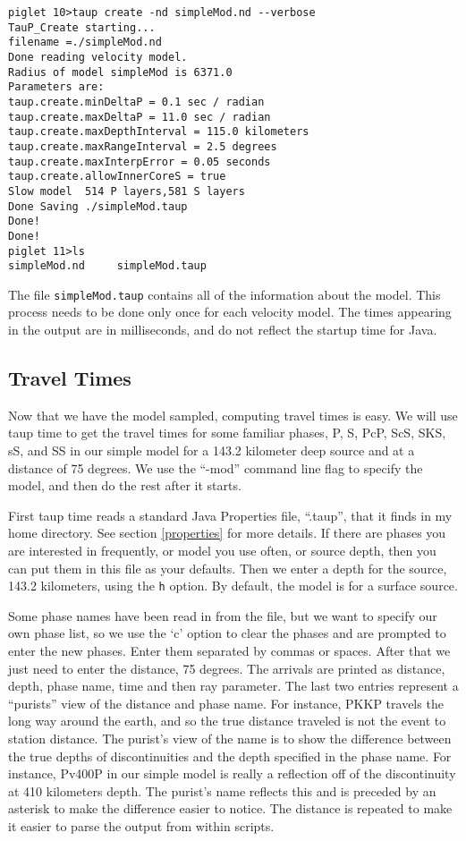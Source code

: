 \begin{verbatim}
piglet 10>taup create -nd simpleMod.nd --verbose
TauP_Create starting...
filename =./simpleMod.nd
Done reading velocity model.
Radius of model simpleMod is 6371.0
Parameters are:
taup.create.minDeltaP = 0.1 sec / radian
taup.create.maxDeltaP = 11.0 sec / radian
taup.create.maxDepthInterval = 115.0 kilometers
taup.create.maxRangeInterval = 2.5 degrees
taup.create.maxInterpError = 0.05 seconds
taup.create.allowInnerCoreS = true
Slow model  514 P layers,581 S layers
Done Saving ./simpleMod.taup
Done!
Done!
piglet 11>ls
simpleMod.nd     simpleMod.taup
\end{verbatim}

The file \texttt{simpleMod.taup} contains all of the information about the
model. This process needs to be done only once for each velocity model.
The times appearing in the output are in milliseconds, and do not reflect the
startup time for Java.

\subsection{Travel Times}

Now that we have the model sampled, computing travel times is easy.
We will use taup time to get the travel times for some familiar phases,
P, S, PcP, ScS, SKS, sS, and SS
in our simple model for a 143.2 kilometer deep
source and at a distance of 75 degrees. We use the ``-mod'' command line
flag to specify the model, and then do the rest after it starts.

First taup time reads a standard Java Properties file, ``.taup'',
that it finds in my home directory. See section \ref{properties} for
more details.
If there are phases you are interested in frequently, or model you use often,
or source depth, then you can put them in this file as your defaults.
Then we enter a depth for the source, 143.2 kilometers, using the \texttt{h}
option. By default, the model is for a surface source.

Some phase names have been read in from the file, but
we want to specify our own phase list, so we use the `c' option
to clear the phases and are prompted to enter the new phases. Enter them
separated by commas or spaces. After that we just need to enter the distance,
75 degrees. The arrivals are printed as distance, depth, phase name, time and then
ray parameter.
The last two entries represent a ``purists'' view of the distance and phase name. For instance, PKKP travels the long way around the earth, and so the
true distance traveled is not the event to station distance. The purist's
view of the name is to show the difference between the true depths of discontinuities and the depth specified in the phase name. For instance,
Pv400P in our simple model is really a reflection off of the discontinuity
at 410 kilometers depth. The purist's name reflects this and is preceded
by an asterisk to make the difference easier to notice.
The distance is repeated to make it easier to parse the output
from within scripts.

